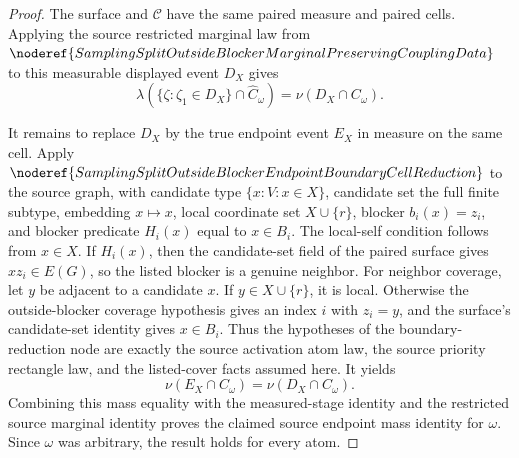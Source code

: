 \begin{proof}
The surface and \(\mathcal C\) have the same paired measure and paired cells.
Applying the source restricted marginal law from
\(\noderef{SamplingSplitOutsideBlockerMarginalPreservingCouplingData}\) to
this measurable displayed event \(D_X\) gives
\[
  \lambda(\{\zeta:\zeta_1\in D_X\}\cap\widehat C_\omega)
  =
  \nu(D_X\cap C_\omega).
\]

It remains to replace \(D_X\) by the true endpoint event \(E_X\) in measure
on the same cell.  Apply
\(\noderef{SamplingSplitOutsideBlockerEndpointBoundaryCellReduction}\) to the
source graph, with candidate type \(\{x:V:x\in X\}\), candidate set the full
finite subtype, embedding \(x\mapsto x\), local coordinate set
\(X\cup\{r\}\), blocker \(b_i(x)=z_i\), and blocker predicate
\(H_i(x)\) equal to \(x\in B_i\).  The local-self condition follows from
\(x\in X\).  If \(H_i(x)\), then the candidate-set field of the paired
surface gives \(x z_i\in E(G)\), so the listed blocker is a genuine neighbor.
For neighbor coverage, let \(y\) be adjacent to a candidate \(x\).  If
\(y\in X\cup\{r\}\), it is local.  Otherwise the outside-blocker coverage
hypothesis gives an index \(i\) with \(z_i=y\), and the surface's
candidate-set identity gives \(x\in B_i\).  Thus the hypotheses of the
boundary-reduction node are exactly the source activation atom law, the source
priority rectangle law, and the listed-cover facts assumed here.  It yields
\[
  \nu(E_X\cap C_\omega)=\nu(D_X\cap C_\omega).
\]
Combining this mass equality with the measured-stage identity and the
restricted source marginal identity proves the claimed source endpoint mass
identity for \(\omega\).  Since \(\omega\) was arbitrary, the result holds for
every atom.
\end{proof}
